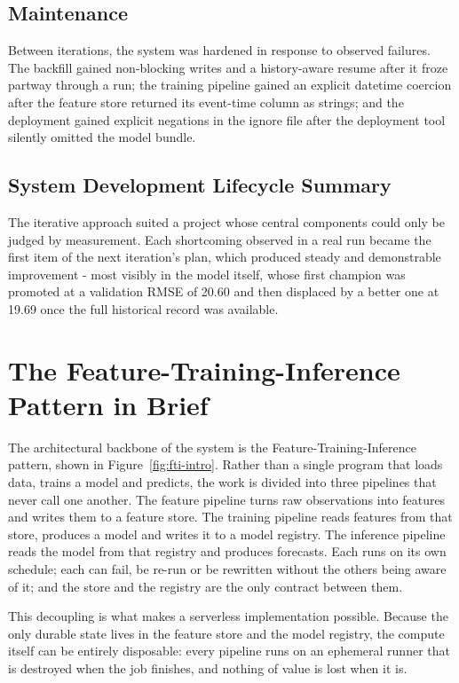 \subsection{Maintenance}
Between iterations, the system was hardened in response to observed failures.
The backfill gained non-blocking writes and a history-aware resume after it froze
partway through a run; the training pipeline gained an explicit datetime
coercion after the feature store returned its event-time column as strings; and
the deployment gained explicit negations in the ignore file after the deployment
tool silently omitted the model bundle.

\subsection{System Development Lifecycle Summary}
The iterative approach suited a project whose central components could only be
judged by measurement. Each shortcoming observed in a real run became the first
item of the next iteration's plan, which produced steady and demonstrable
improvement - most visibly in the model itself, whose first champion was
promoted at a validation RMSE of 20.60 and then displaced by a better one at
19.69 once the full historical record was available.

\section{The Feature-Training-Inference Pattern in Brief}
The architectural backbone of the system is the Feature-Training-Inference
pattern, shown in Figure~\ref{fig:fti-intro}. Rather than a single program that
loads data, trains a model and predicts, the work is divided into three pipelines
that never call one another. The feature pipeline turns raw observations into
features and writes them to a feature store. The training pipeline reads
features from that store, produces a model and writes it to a model registry. The
inference pipeline reads the model from that registry and produces forecasts.
Each runs on its own schedule; each can fail, be re-run or be rewritten without
the others being aware of it; and the store and the registry are the only
contract between them.


This decoupling is what makes a serverless implementation possible. Because the
only durable state lives in the feature store and the model registry, the compute
itself can be entirely disposable: every pipeline runs on an ephemeral runner
that is destroyed when the job finishes, and nothing of value is lost when it is.

